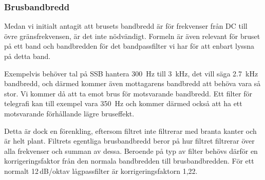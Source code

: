 \subsubsection{Brusbandbredd}

Medan vi initialt antagit att brusets bandbredd är för frekvenser från
DC till övre gränsfrekvensen, är det inte nödvändigt.
Formeln är även relevant för bruset på ett band och bandbredden för
det bandpassfilter vi har för att enbart lyssna på detta band.

Exempelvis behöver tal på SSB hantera \SI{300}{\hertz} till \SI{3}{\kilo\hertz},
det vill säga \SI{2,7}{\kilo\hertz} bandbredd, och därmed kommer även
mottagarens bandbredd att behöva vara så stor.
Vi kommer då att ta emot brus för motsvarande bandbredd.
Ett filter för telegrafi kan till exempel vara \SI{350}{\hertz} och kommer
därmed också att ha ett motsvarande förhållande lägre bruseffekt.

Detta är dock en förenkling, eftersom filtret inte filtrerar med
branta kanter och är helt plant.
Filtrets egentliga brusbandbredd beror på hur filtret filtrerar över
alla frekvenser och summan av dessa.
Beroende på typ av filter behövs därför en korrigeringsfaktor
från den normala bandbredden till brusbandbredden.
För ett normalt 12\,dB/oktav lågpassfilter är korrigeringsfaktorn 1,22.
